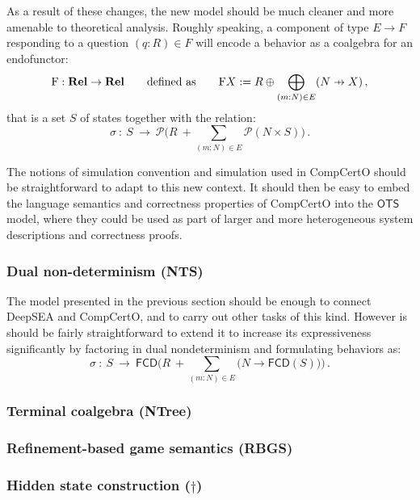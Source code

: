 \documentclass{article}
\newcommand\pfun{\mathrel{\ooalign{\hfil$\mapstochar\mkern5mu$\hfil\cr$\to$\cr}}}
\begin{document}
As a result of these changes,
the new model should be much cleaner and
more amenable to theoretical analysis.
Roughly speaking,
a component of type $E \rightarrow F$
responding to a question $(q \mathbin: R) \in F$
will encode a behavior
as a coalgebra for an endofunctor:
\[
  \mathrm{F} : \mathbf{Rel} \rightarrow \mathbf{Rel}
  \qquad \text{defined as} \qquad
  \mathrm{F} X := R \oplus \bigoplus_{(m \mathbin: N) \in E} (N \pfun X)
  \,,
\]
that is a set $S$ of states together with the relation:
\[
  \sigma \: : \: S \: \rightarrow \: \mathcal{P}
    \Big( R \: + \sum_{(m \mathbin: N) \in E} \mathcal{P}(N \times S) \Big)
  \,.
\]

The notions of simulation convention and simulation
used in CompCertO
should be straightforward to adapt
to this new context.
It should then be easy to embed
the language semantics and correctness properties of CompCertO
into the $\mathsf{OTS}$ model,
where they could be used as part of
larger and more heterogeneous
system descriptions and correctness proofs.


\subsubsection{Dual non-determinism (NTS)} %

The model presented in the previous section
should be enough to connect DeepSEA and CompCertO,
and to carry out other tasks of this kind.
However is should be fairly straightforward to extend it
to increase its expressiveness significantly
by factoring in dual nondeterminism
and formulating behaviors as:
\[
  \sigma \: : \: S \: \rightarrow \: \mathsf{FCD}
    \Big( R \: + \sum_{(m \mathbin: N) \in E}
        \big( N \rightarrow \mathsf{FCD}(S) \big) \Big)
  \,.
\]


\subsubsection{Terminal coalgebra (NTree)}

\subsubsection{Refinement-based game semantics (RBGS)}

\subsubsection{Hidden state construction ($\dagger$)}
\end{document}
